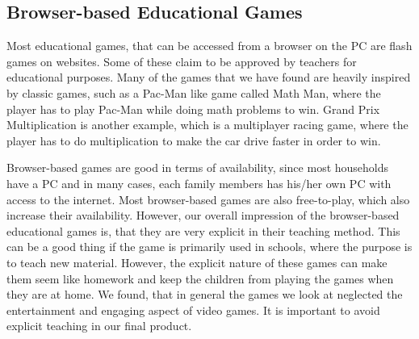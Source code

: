 \subsection{Browser-based Educational Games}
Most educational games, that can be accessed from a browser on the PC are flash games on websites.
Some of these claim to be approved by teachers for educational purposes.
Many of the games that we have found are heavily inspired by classic games, such as a Pac-Man like game called Math Man, where the player has to play Pac-Man while doing math problems to win.\cite{mathman}
Grand Prix Multiplication is another example, which is a multiplayer racing game, where the player has to do multiplication to make the car drive faster in order to win.\cite{grandprix}\newline

Browser-based games are good in terms of availability, since most households have a PC and in many cases, each family members has his/her own PC with access to the internet. Most browser-based games are also free-to-play, which also increase their availability. However, our overall impression of the browser-based educational games is, that they are very explicit in their teaching method. This can be a good thing if the game is primarily used in schools, where the purpose is to teach new material. However, the explicit nature of these games can make them seem like homework and keep the children from playing the games when they are at home. We found, that in general the games we look at neglected the entertainment and engaging aspect of video games. It is important to avoid explicit teaching in our final product.